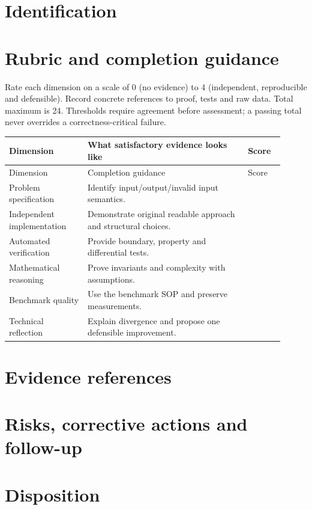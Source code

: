 \documentclass[11pt,letterpaper]{article}
\begin{document}
\tableofcontents
\clearpage
{}
\section{Identification}
\section{Rubric and completion guidance}
Rate each dimension on a scale of 0 (no evidence) to 4 (independent, reproducible and defensible). Record concrete references to proof, tests and raw data. Total maximum is 24. Thresholds require agreement before assessment; a passing total never overrides a correctness-critical failure.
\small
\begin{longtable}{@{}p{0.26\linewidth}p{0.53\linewidth}p{0.12\linewidth}@{}}\toprule Dimension & What satisfactory evidence looks like & Score\\\midrule\endfirsthead\toprule Dimension & Completion guidance & Score\\\midrule\endhead
Problem specification & Identify input/output/invalid input semantics. & \\[1.0em]
Independent implementation & Demonstrate original readable approach and structural choices. & \\[1.0em]
Automated verification & Provide boundary, property and differential tests. & \\[1.0em]
Mathematical reasoning & Prove invariants and complexity with assumptions. & \\[1.0em]
Benchmark quality & Use the benchmark SOP and preserve measurements. & \\[1.0em]
Technical reflection & Explain divergence and propose one defensible improvement. & \\[1.0em]
\bottomrule\end{longtable}
\normalsize\section{Evidence references}
\section{Risks, corrective actions and follow-up}
\section{Disposition}
\end{document}
